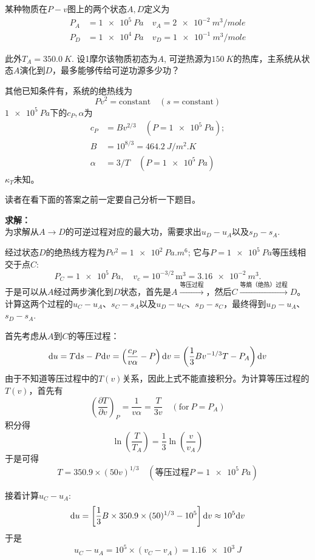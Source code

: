 \begin{example}
 某种物质在$P-v$图上的两个状态$A, D$定义为
\begin{align*}
	P_A &= \SI{1e5}{Pa} \quad v_A = \SI{2e-2}{m^3 \per mole} \\
	P_D &= \SI{1e4}{Pa} \quad v_D = \SI{1e-1}{m^3 \per mole}
\end{align*}

此外$T_A = \SI{350.0}{K}$. 设1摩尔该物质初态为$A$, 可逆热源为$\SI{150}{K}$的热库，主系统从状态$A$演化到$D$，最多能够传给可逆功源多少功？

其他已知条件有，系统的绝热线为
\[
	Pv^2 = \text{constant} \quad (s = \text{constant})
\]
$\SI{1e5}{Pa}$下的$c_P, \alpha$为 
\begin{align*}
	c_P &= Bv^{2/3} \quad ( P = \SI{1e5}{Pa}); \\
	B &= 10^{8/3} = \SI{464.2}{J \per m^2.K} \\
	\alpha &= 3/T \quad ( P = \SI{1e5}{Pa})
\end{align*}
$\kappa_T$未知。

读者在看下面的答案之前一定要自己分析一下题目。

{\bf 求解：}\\
为求解从$A \to D$的可逆过程对应的最大功，需要求出$u_D - u_A$以及$s_D - s_A$. 

经过状态$D$的绝热线方程为$Pv^2 = \SI{1e2}{Pa.m^6}$; 它与$P = \SI{1e5}{Pa}$等压线相交于点$C$:
\[
	P_C = \SI{1e5}{Pa}, \quad v_c = 10^{-3/2}\, \mathrm{m}^3 = \SI{3.16e-2}{m^3}.
\]
于是可以从$A$经过两步演化到$D$状态，首先是$A \stackrel{\text{等压过程}}{\longrightarrow}$，然后$C \stackrel{\text{等熵（绝热）过程}}{\longrightarrow} D$。计算这两个过程的$u_C - u_A$、$s_C - s_A$以及$u_D - u_C$、$s_D - s_C$，最终得到$u_D - u_A$、$s_D - s_A$.

首先考虑从$A$到$C$的等压过程：
\[
	\mathrm{d} u = T \mathrm{d} s - P \mathrm{d} v = \left( \frac{c_P}{v\alpha} - P \right) \mathrm{d} v = \left( \frac{1}{3} B v^{-1/3} T - P_A \right) \mathrm{d} v
\]
由于不知道等压过程中的$T(v)$关系，因此上式不能直接积分。为计算等压过程的$T(v)$，首先有
\[
	\left( \frac{\partial T}{\partial v} \right)_P = \frac{1}{v \alpha} = \frac{T}{3v} \quad (\text{for}\ P = P_A)
\]
积分得
\[
	\ln \left( \frac{T}{T_A} \right) = \frac{1}{3} \ln \left( \frac{v}{v_A} \right)
\]
于是可得 
\[
	T = 350.9 \times (50v)^{1/3} \quad (\text{等压过程}P = \SI{1e5}{Pa})
\]

接着计算$u_C - u_A$:
\[
	\mathrm{d} u = \left[ \frac{1}{3} B \times 350.9 \times (50)^{1/3} - 10^5 \right] \mathrm{d} v \approx 10^5 \mathrm{d} v
\]
于是 
\[
	u_C - u_A = 10^5 \times (v_C - v_A) = \SI{1.16e3}{J}
\]


\end{example}
